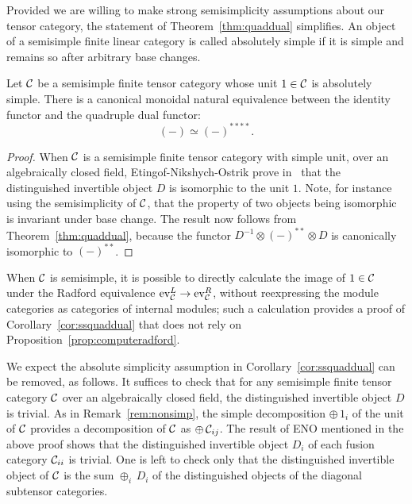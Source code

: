 \documentclass{amsart}
\begin{document}
Provided we are willing to make strong semisimplicity assumptions about our tensor category, the statement of Theorem~\ref{thm:quaddual} simplifies.  An object of a semisimple finite linear category is called absolutely simple if it is simple and remains so after arbitrary base changes. \begin{corollary} \label{cor:ssquaddual}
Let $\mathcal C$ be a semisimple finite tensor category whose unit $1 \in \mathcal C$ is absolutely simple. There is a canonical monoidal natural equivalence between the identity functor and the quadruple dual functor:
\[
(-) \simeq (-)^{****}.
\]
\end{corollary} 
\begin{proof}
When $\mathcal C$ is a semisimple finite tensor category with simple unit, over an algebraically closed field, Etingof-Nikshych-Ostrik prove in~\cite[Cor 6.4]{MR2097289} that the distinguished invertible object $D$ is isomorphic to the unit $1$.  Note, for instance using the semisimplicity of $\mathcal C$, that the property of two objects being isomorphic is invariant under base change.  The result now follows from Theorem~\ref{thm:quaddual}, because the functor $D^{-1} \otimes (-)^{**} \otimes D$ is canonically isomorphic to $(-)^{**}$.
\end{proof}

When $\mathcal C$ is semisimple, it is possible to directly calculate the image of $1 \in \mathcal C$ under the Radford equivalence $\mathrm{ev}_\mathcal C^L \rightarrow \mathrm{ev}_\mathcal C^R$, without reexpressing the module categories as categories of internal modules; such a calculation provides a proof of Corollary~\ref{cor:ssquaddual} that does not rely on Proposition~\ref{prop:computeradford}.

\begin{remark}
We expect the absolute simplicity assumption in Corollary~\ref{cor:ssquaddual} can be removed, as follows.  It suffices to check that for any semisimple finite tensor category $\mathcal C$ over an algebraically closed field, the distinguished invertible object $D$ is trivial.  As in Remark~\ref{rem:nonsimp}, the simple decomposition $\oplus \, 1_i$ of the unit of $\mathcal C$ provides a decomposition of $\mathcal C$ as $\oplus \, \mathcal C_{ij}$.  The result of ENO mentioned in the above proof shows that the distinguished invertible object $D_i$ of each fusion category $\mathcal C_{ii}$ is trivial.  One is left to check only that the distinguished invertible object of $\mathcal C$ is the sum $\oplus_i \, D_i$ of the distinguished objects of the diagonal subtensor categories.
\end{remark}
\end{document}

